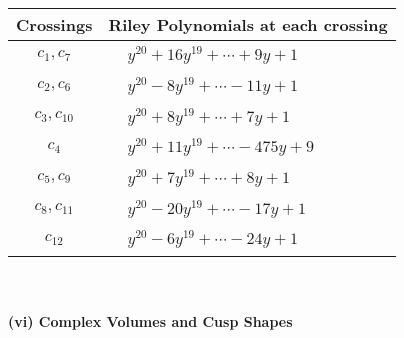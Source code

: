 \documentclass[1p]{elsarticle_modified}
\theoremstyle{definition}
\begin{document}
\begin{tabular}{m{50pt}|m{274pt}}
Crossings & \hspace{64pt}Riley Polynomials at each crossing \\
\hline $$\begin{aligned}c_{1},c_{7}\end{aligned}$$&$\begin{aligned}
&y^{20}+16 y^{19}+\cdots+9 y+1
\end{aligned}$\\
\hline $$\begin{aligned}c_{2},c_{6}\end{aligned}$$&$\begin{aligned}
&y^{20}-8 y^{19}+\cdots-11 y+1
\end{aligned}$\\
\hline $$\begin{aligned}c_{3},c_{10}\end{aligned}$$&$\begin{aligned}
&y^{20}+8 y^{19}+\cdots+7 y+1
\end{aligned}$\\
\hline $$\begin{aligned}c_{4}\end{aligned}$$&$\begin{aligned}
&y^{20}+11 y^{19}+\cdots-475 y+9
\end{aligned}$\\
\hline $$\begin{aligned}c_{5},c_{9}\end{aligned}$$&$\begin{aligned}
&y^{20}+7 y^{19}+\cdots+8 y+1
\end{aligned}$\\
\hline $$\begin{aligned}c_{8},c_{11}\end{aligned}$$&$\begin{aligned}
&y^{20}-20 y^{19}+\cdots-17 y+1
\end{aligned}$\\
\hline $$\begin{aligned}c_{12}\end{aligned}$$&$\begin{aligned}
&y^{20}-6 y^{19}+\cdots-24 y+1
\end{aligned}$\\
\hline
\end{tabular}\\~\\
\newpage\flushleft \textbf{(vi) Complex Volumes and Cusp Shapes}
\end{document}
